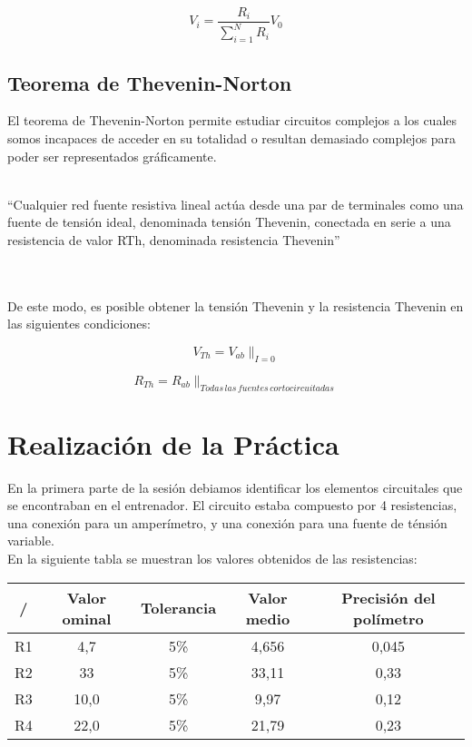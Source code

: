 \documentclass[a4paper,11pt]{article}
\begin{document}
\begin{displaymath}
V_i=\frac{R_i}{\sum_{i=1}^N R_{i}}V_0
\end{displaymath}

\subsection{Teorema de Thevenin-Norton}
El teorema de Thevenin-Norton permite estudiar circuitos complejos a los cuales somos incapaces de acceder en su totalidad o resultan demasiado complejos para poder ser representados gráficamente.\\ \\
\begin{em}
“Cualquier red fuente resistiva lineal actúa desde una par de terminales como una fuente de tensión ideal, denominada tensión Thevenin, conectada en serie a una resistencia de valor RTh, denominada resistencia Thevenin”
\end{em}\\ \\
De este modo, es posible obtener la tensión Thevenin y la resistencia Thevenin en las siguientes condiciones:


\begin{displaymath}
V_{Th}=V_{ab}\|_{I=0}
\end{displaymath}

\begin{displaymath}
R_{Th}=R_{ab}\|_{Todas\,las\,fuentes\,cortocircuitadas}
\end{displaymath}

\section{Realización de la Práctica}
En la primera parte de la sesión debiamos identificar los elementos circuitales que se encontraban en el entrenador. El circuito estaba compuesto por 4 resistencias, una conexión para un amperímetro, y una conexión para una fuente de ténsión variable.\\
En la siguiente tabla se muestran los valores obtenidos de las resistencias:

\begin{table}
\begin{tabular}{|c|c|c|c|c|}
\hline 
/ & Valor ominal & Tolerancia & Valor medio & Precisión del polímetro \\ 
\hline 
R1 & 4,7 & 5\% & 4,656 & 0,045 \\ 
\hline 
R2 & 33 & 5\% & 33,11 & 0,33 \\ 
\hline 
R3 & 10,0 & 5\% & 9,97 & 0,12 \\ 
\hline 
R4 & 22,0 & 5\% & 21,79 & 0,23 \\ 
\hline 

\end{tabular} 
\end{table}
\end{document}
